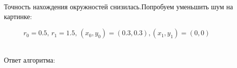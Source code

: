 \documentclass[12pt,twoside]{article}
\begin{document}
Точность нахождения окружностей снизилась.\newpage Попробуем уменьшить шум на картинке: \\
\begin{figure}[h]
\caption{$r_0 = 0.5, \, r_1 = 1.5, \, (x_0, y_0) = (0.3, 0.3), (x_1, y_1) = (0, 0)$}
\end{figure} \\
Ответ алгоритма: \\
\begin{figure}[h]
\end{figure}\\
\end{document}
